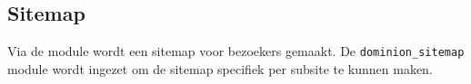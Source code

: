 \subsection{Sitemap}

Via de  module wordt een sitemap voor bezoekers gemaakt. De \texttt{dominion\_sitemap} module wordt ingezet om de sitemap specifiek per subsite te kunnen maken.
